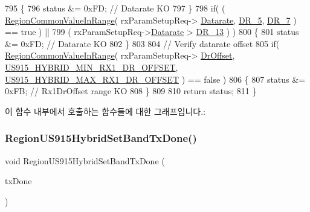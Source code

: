 \begin{DoxyCode}
795     \{
796         status &= 0xFD; \textcolor{comment}{// Datarate KO}
797     \}
798     \textcolor{keywordflow}{if}( ( \mbox{\hyperlink{group___r_e_g_i_o_n_c_o_m_m_o_n_gafdd1c80d953e18d755a631b72a9c3bd3}{RegionCommonValueInRange}}( rxParamSetupReq->
      \mbox{\hyperlink{structs_rx_param_setup_req_params_ae2f6080f3aa0e9485c55513ca56bb24d}{Datarate}}, \mbox{\hyperlink{group___r_e_g_i_o_n_ga872e12c82020c02a7f70a1c6ed1375df}{DR\_5}}, \mbox{\hyperlink{group___r_e_g_i_o_n_ga3a06805baf4f00911a3a5d3dbadebf61}{DR\_7}} ) == true ) ||
799         ( rxParamSetupReq->\mbox{\hyperlink{structs_rx_param_setup_req_params_ae2f6080f3aa0e9485c55513ca56bb24d}{Datarate}} > \mbox{\hyperlink{group___r_e_g_i_o_n_ga226f47470cc69a6fe831f7c92709bc1f}{DR\_13}} ) )
800     \{
801         status &= 0xFD; \textcolor{comment}{// Datarate KO}
802     \}
803 
804     \textcolor{comment}{// Verify datarate offset}
805     \textcolor{keywordflow}{if}( \mbox{\hyperlink{group___r_e_g_i_o_n_c_o_m_m_o_n_gafdd1c80d953e18d755a631b72a9c3bd3}{RegionCommonValueInRange}}( rxParamSetupReq->
      \mbox{\hyperlink{structs_rx_param_setup_req_params_ad920e18a48423b1eb1fe40d1b2b082d4}{DrOffset}}, \mbox{\hyperlink{group___r_e_g_i_o_n_u_s915_h_y_b_ga526b61da154115ac916e9f217d50cd07}{US915\_HYBRID\_MIN\_RX1\_DR\_OFFSET}}, 
      \mbox{\hyperlink{group___r_e_g_i_o_n_u_s915_h_y_b_ga1e70e7e114c0fd6bf905085e78def426}{US915\_HYBRID\_MAX\_RX1\_DR\_OFFSET}} ) == false )
806     \{
807         status &= 0xFB; \textcolor{comment}{// Rx1DrOffset range KO}
808     \}
809 
810     \textcolor{keywordflow}{return} status;
811 \}
\end{DoxyCode}
이 함수 내부에서 호출하는 함수들에 대한 그래프입니다.\+:
\mbox{\label{group___r_e_g_i_o_n_u_s915_h_y_b_gaffb1cec48663f7fc2d7aeae9411e3d76}} 
\subsubsection{\texorpdfstring{Region\+U\+S915\+Hybrid\+Set\+Band\+Tx\+Done()}{RegionUS915HybridSetBandTxDone()}}
{\footnotesize\ttfamily void Region\+U\+S915\+Hybrid\+Set\+Band\+Tx\+Done (\begin{DoxyParamCaption}\item[{\mbox{\hyperlink{group___r_e_g_i_o_n_gad0524aa0673c0814a71e7a4f9cade3fc}{Set\+Band\+Tx\+Done\+Params\+\_\+t}} $\ast$}]{tx\+Done }\end{DoxyParamCaption})}



